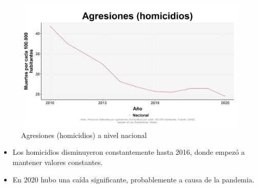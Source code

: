     \begin{figure}[H]
        \caption{Agresiones (homicidios) a nivel nacional \label{map_result_2} }
        \begin{center}
        \includegraphics[width=\textwidth,keepaspectratio]{img/var_289_trend.png}
        \end{center}
    \end{figure}
            \begin{itemize}
                \item Los homicidios disminuyeron constantemente hasta 2016, donde empezó a mantener valores constantes.
                \item En 2020 hubo una caída significante, probablemente a causa de la pandemia.
                \end{itemize}

